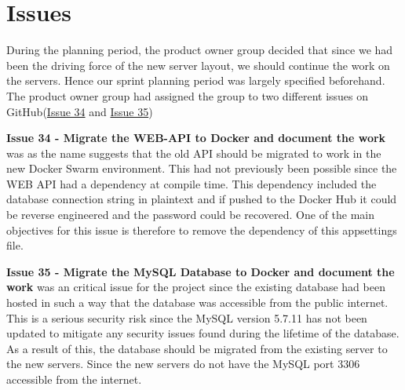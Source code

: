 \section{Issues}
During the planning period, the product owner group decided that since we had been the driving force of the new server layout, we should continue the work on the servers. 
Hence our sprint planning period was largely specified beforehand. 
The product owner group had assigned the group to two different issues on GitHub(\href{https://github.com/aau-giraf/wiki/issues/34}{Issue 34} and \href{https://github.com/aau-giraf/wiki/issues/35}{Issue 35})

\textbf{Issue 34 - Migrate the WEB-API to Docker and document the work} was as the name suggests that the old API should be migrated to work in the new Docker Swarm environment. 
This had not previously been possible since the WEB API had a dependency at compile time. 
This dependency included the database connection string in plaintext and if pushed to the Docker Hub it could be reverse engineered and the password could be recovered. 
One of the main objectives for this issue is therefore to remove the dependency of this appsettings file. 

\textbf{Issue 35 - Migrate the MySQL Database to Docker and document the work} was an critical issue for the project since the existing database had been hosted in such a way that the database was accessible from the public internet. 
This is a serious security risk since the MySQL version 5.7.11 has not been updated to mitigate any security issues found during the lifetime of the database. 
As a result of this, the database should be migrated from the existing server to the new servers. 
Since the new servers do not have the MySQL port $3306$ accessible from the internet. 
